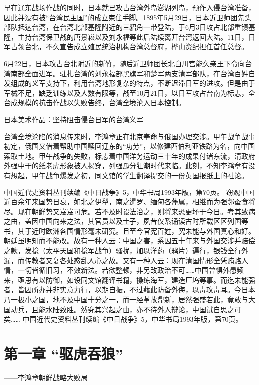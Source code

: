 \documentclass[12pt,UTF8]{ctexbook}
\begin{document}
早在辽东战场作战的同时，日本就已攻占台湾外岛澎湖列岛，预作入侵台湾准备，因此并没有被“台湾民主国”的成立束住手脚。1895年5月29日，日本近卫师团先头部队抵达台湾，在台湾北部基隆附近的三貂角一带登陆，于6月3日攻占北部重镇基隆，主持台湾保卫战的唐景崧以及刘永福等此后陆续离开台湾返回大陆。11日，日军占领台北，不久宣告成立殖民统治机构台湾总督府，桦山资纪担任首任总督。

6月22日，日本攻占台北附近的新竹，随后近卫师团长北白川宫能久亲王下令向台湾南部全面进军。驻扎台湾的刘永福部黑旗军和楚军两支清军部队，在台湾百姓自发组成的义军支持下，利用台湾地形复杂的特点，不断迟滞日军的进攻。但是由于军械不足，缺乏训练以及人数有限等，战至10月21日，以日军攻占台南为标志，全台成规模的抗击作战以失败告终，台湾全境沦入日本控制。


日本美术作品：坚持阻击侵台日军的台湾义军

台湾全境沦陷的消息传来时，李鸿章正在北京奉命与俄国办理交涉。甲午战争战事初定，俄国又借着帮助中国赎回辽东的“功劳”，以修建西伯利亚铁路为名，向中国索取土地。甲午战争的失败，标志着中国洋务运动三十年的成果付诸东流，清政府外强中干的纸老虎形象被人揭穿，列强瓜分狂潮时代来临。此刻，不知李鸿章有没有想起，甲午战争爆发之初，同文馆的学生翻译提交的一份英国报纸上的社论。

中国近代史资料丛刊续编《中日战争》5，中华书局1993年版，第70页。
窃观中国近百余年来国势日衰，如北之伊犁，南之暹罗、缅甸各藩属，相继而为强邻蚕食将尽。现在朝鲜势又岌岌可危。若不及时设法治之，则将来恐更坏于今日。考其致病之由，盖因中国向来之法，其官员以及士子，夙昔仅系诵读古时所载区区列国等书，其于近时欧洲各国情形毫未研究。且至今官宪百姓，究未能与外国真心和好。朝廷虽明知而不能改。故有一种人云：中国之害，系因五十年来与外国交涉并赔偿之款，发捻（太平天国和捻军战争）骚扰，加以洋药（鸦片）遍行，银钱全行外漏，而传教者又复各处惑乱人心之故。又有一种人云：现在清国情形全凭贿赂人情，一切皆循旧习，不效新法。若欲整顿，非另改政治不可……中国曾惧外患频来，亟思有以防御，如设同文馆翻译书籍，操练海军，建造厂坞等事。而迄未能强者，皆因所办并非实意力行，以期自振，不过藉此防备外侮，以毒攻毒耳。今日本乃一极小之国，地不及中国十分之一，而一经革故鼎新，居然强盛若此，竟敢与大国动兵，且能水陆致胜。然究其兴起之由，亦不待外人辩论，中国试自思之可矣…… 中国近代史资料丛刊续编《中日战争》5，中华书局1993年版，第70页。

\mainmatter

\chapter{第一章 “驱虎吞狼”}

——李鸿章朝鲜战略大败局
\end{document}
